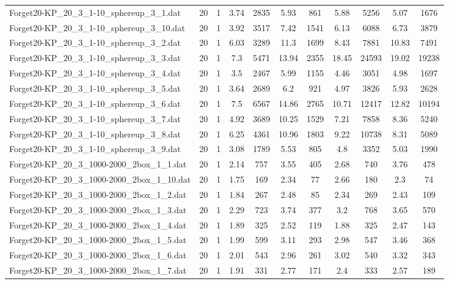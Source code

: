 \begin{table}[!ht]
\begin{tabular}{lcccccccccc}
Forget20-KP\_20\_3\_1-10\_sphereup\_3\_1.dat & 20 & 1 & 3.74 & 2835 & 5.93 & 861 & 5.88 & 5256 & 5.07 & 1676 \\
Forget20-KP\_20\_3\_1-10\_sphereup\_3\_10.dat & 20 & 1 & 3.92 & 3517 & 7.42 & 1541 & 6.13 & 6088 & 6.73 & 3879 \\
Forget20-KP\_20\_3\_1-10\_sphereup\_3\_2.dat & 20 & 1 & 6.03 & 3289 & 11.3 & 1699 & 8.43 & 7881 & 10.83 & 7491 \\
Forget20-KP\_20\_3\_1-10\_sphereup\_3\_3.dat & 20 & 1 & 7.3 & 5471 & 13.94 & 2355 & 18.45 & 24593 & 19.02 & 19238 \\
Forget20-KP\_20\_3\_1-10\_sphereup\_3\_4.dat & 20 & 1 & 3.5 & 2467 & 5.99 & 1155 & 4.46 & 3051 & 4.98 & 1697 \\
Forget20-KP\_20\_3\_1-10\_sphereup\_3\_5.dat & 20 & 1 & 3.64 & 2689 & 6.2 & 921 & 4.97 & 3826 & 5.93 & 2628 \\
Forget20-KP\_20\_3\_1-10\_sphereup\_3\_6.dat & 20 & 1 & 7.5 & 6567 & 14.86 & 2765 & 10.71 & 12417 & 12.82 & 10194 \\
Forget20-KP\_20\_3\_1-10\_sphereup\_3\_7.dat & 20 & 1 & 4.92 & 3689 & 10.25 & 1529 & 7.21 & 7858 & 8.36 & 5240 \\
Forget20-KP\_20\_3\_1-10\_sphereup\_3\_8.dat & 20 & 1 & 6.25 & 4361 & 10.96 & 1803 & 9.22 & 10738 & 8.31 & 5089 \\
Forget20-KP\_20\_3\_1-10\_sphereup\_3\_9.dat & 20 & 1 & 3.08 & 1789 & 5.53 & 805 & 4.8 & 3352 & 5.03 & 1990 \\
Forget20-KP\_20\_3\_1000-2000\_2box\_1\_1.dat & 20 & 1 & 2.14 & 757 & 3.55 & 405 & 2.68 & 740 & 3.76 & 478 \\
Forget20-KP\_20\_3\_1000-2000\_2box\_1\_10.dat & 20 & 1 & 1.75 & 169 & 2.34 & 77 & 2.66 & 180 & 2.3 & 74 \\
Forget20-KP\_20\_3\_1000-2000\_2box\_1\_2.dat & 20 & 1 & 1.84 & 267 & 2.48 & 85 & 2.34 & 269 & 2.43 & 109 \\
Forget20-KP\_20\_3\_1000-2000\_2box\_1\_3.dat & 20 & 1 & 2.29 & 723 & 3.74 & 377 & 3.2 & 768 & 3.65 & 570 \\
Forget20-KP\_20\_3\_1000-2000\_2box\_1\_4.dat & 20 & 1 & 1.89 & 325 & 2.52 & 119 & 1.88 & 325 & 2.47 & 143 \\
Forget20-KP\_20\_3\_1000-2000\_2box\_1\_5.dat & 20 & 1 & 1.99 & 599 & 3.11 & 293 & 2.98 & 547 & 3.46 & 368 \\
Forget20-KP\_20\_3\_1000-2000\_2box\_1\_6.dat & 20 & 1 & 2.01 & 543 & 2.96 & 261 & 3.02 & 540 & 3.32 & 343 \\
Forget20-KP\_20\_3\_1000-2000\_2box\_1\_7.dat & 20 & 1 & 1.91 & 331 & 2.77 & 171 & 2.4 & 333 & 2.57 & 189 \\

\end{tabular}
\end{table}
